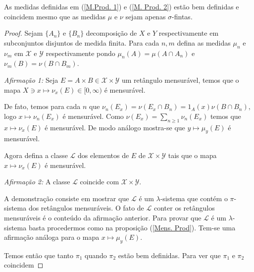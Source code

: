 \begin{corolario}
As medidas definidas em (\ref{M.Prod. 1}) e (\ref{M. Prod. 2}) estão bem definidas e  coincidem mesmo que as medidas 
$\mu$ e $\nu$ sejam apenas $\sigma$-fintas.
\end{corolario}

\begin{proof}
Sejam $\{A_n\}$ e $\{B_n\}$ decomposição de $X$ e $Y$ respectivamente em subconjuntos 
disjuntos de medida finita. Para cada $n,m$ defina as medidas $\mu_n$ e $\nu_m$ 
em  $\mathscr{X}$ e $ \mathscr{Y}$ respectivamente  pondo  $\mu_n(A)=\mu(A\cap A_n)$ e 
$\nu_m(B)=\nu(B\cap B_m)$. 
\medskip

\noindent \emph{Afirmação 1:} Seja $E=A\times B\in \mathscr{X}\times \mathscr{Y}$ um retângulo mensurável, temos que o mapa 
$X\ni x\mapsto \nu_x(E)\in [0, \infty)$ é mensurável.
\medskip


 De fato, temos para cada $n$ que  $\nu_n(E_x)=\nu(E_x\cap B_n)=1_A(x)  \nu(B\cap B_n)$, logo 
 $x\mapsto \nu_n(E_x)$ é mensurável. Como $\nu(E_x)=\sum_{n\geq 1}\nu_n(E_x)$ temos que 
 $x\mapsto \nu_x(E)$ é mensurável. De modo análogo mostra-se que $y\mapsto \mu_y(E)$ é mensurável.

Agora defina a classe $\mathscr{L}$ dos elementos de $E$ de $\mathscr{X}\times \mathscr{Y}$ tais que 
o mapa $x\mapsto \nu_x(E)$ é mensurável.

\noindent \emph{Afirmação 2:} A classe $\mathscr{L}$ coincide com $\mathscr{X}\times \mathscr{Y}$.
\medskip

A demonstração consiste em mostrar que $\mathscr{L}$ é um $\lambda$-sistema que contém o $\pi$-sistema dos 
retângulos mensuráveis.
 O fato de $\mathscr{L}$ conter os retângulos 
 mensuráveis é o conteúdo da afirmação anterior.
 Para provar que $\mathscr{L}$ é um $\lambda$-sistema basta procedermos como na proposição (\ref{Mens. Prod}).
  Tem-se uma afirmação análoga para o mapa $x\mapsto \mu_y(E)$. 
  
  Temos então que tanto $\pi_1$ quando $\pi_2$ estão bem definidas. Para ver que $\pi_1$ e $\pi_2$ coincidem 
  
 


\end{proof}


